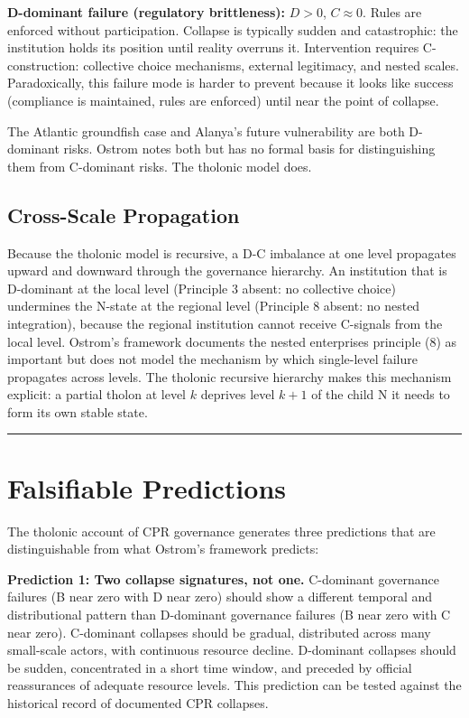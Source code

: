 \documentclass[12pt]{article}
\begin{document}
\textbf{D-dominant failure (regulatory brittleness):} \(D > 0\),
\(C \approx 0\). Rules are enforced without participation. Collapse is
typically sudden and catastrophic: the institution holds its position
until reality overruns it. Intervention requires C-construction:
collective choice mechanisms, external legitimacy, and nested scales.
Paradoxically, this failure mode is harder to prevent because it looks
like success (compliance is maintained, rules are enforced) until near
the point of collapse.

The Atlantic groundfish case and Alanya's future vulnerability are both
D-dominant risks. Ostrom notes both but has no formal basis for
distinguishing them from C-dominant risks. The tholonic model does.

\subsection{Cross-Scale Propagation}\label{cross-scale-propagation}

Because the tholonic model is recursive, a D-C imbalance at one level
propagates upward and downward through the governance hierarchy. An
institution that is D-dominant at the local level (Principle 3 absent:
no collective choice) undermines the N-state at the regional level
(Principle 8 absent: no nested integration), because the regional
institution cannot receive C-signals from the local level. Ostrom's
framework documents the nested enterprises principle (8) as important
but does not model the mechanism by which single-level failure
propagates across levels. The tholonic recursive hierarchy makes this
mechanism explicit: a partial tholon at level \(k\) deprives level
\(k+1\) of the child N it needs to form its own stable state.

\begin{center}\rule{0.5\linewidth}{0.5pt}\end{center}

\section{Falsifiable Predictions}\label{falsifiable-predictions}

The tholonic account of CPR governance generates three predictions that
are distinguishable from what Ostrom's framework predicts:

\textbf{Prediction 1: Two collapse signatures, not one.} C-dominant
governance failures (B near zero with D near zero) should show a
different temporal and distributional pattern than D-dominant governance
failures (B near zero with C near zero). C-dominant collapses should be
gradual, distributed across many small-scale actors, with continuous
resource decline. D-dominant collapses should be sudden, concentrated in
a short time window, and preceded by official reassurances of adequate
resource levels. This prediction can be tested against the historical
record of documented CPR collapses.
\end{document}
